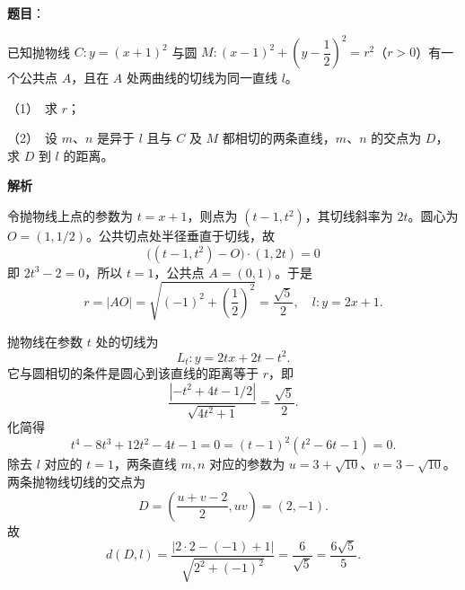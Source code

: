 \begin{answer}

\textbf{题目}：

已知抛物线 $C:y=(x+1)^2$ 与圆 $M:(x-1)^2+\left(y-\dfrac12\right)^2=r^2$（$r>0$）有一个公共点 $A$，且在 $A$ 处两曲线的切线为同一直线 $l$。

（1）　求 $r$；

（2）　设 $m\text{、}n$ 是异于 $l$ 且与 $C$ 及 $M$ 都相切的两条直线，$m\text{、}n$ 的交点为 $D$，求 $D$ 到 $l$ 的距离。

\textbf{解析}


令抛物线上点的参数为 $t=x+1$，则点为 $(t-1,t^2)$，其切线斜率为 $2t$。圆心为 $O=(1,1/2)$。公共切点处半径垂直于切线，故
\nopagebreak[4]
\[
\bigl((t-1,t^2)-O\bigr)\cdot(1,2t)=0
\]
即 $2t^3-2=0$，所以 $t=1$，公共点 $A=(0,1)$。于是
\nopagebreak[4]
\[
r=|AO|=\sqrt{(-1)^2+\left(\frac12\right)^2}=\frac{\sqrt5}{2},
\quad l:y=2x+1.
\]


抛物线在参数 $t$ 处的切线为
\nopagebreak[4]
\[
L_t:y=2tx+2t-t^2.
\]
它与圆相切的条件是圆心到该直线的距离等于 $r$，即
\nopagebreak[4]
\[
\frac{|{-t^2+4t-1/2}|}{\sqrt{4t^2+1}}=\frac{\sqrt5}{2}.
\]
化简得
\nopagebreak[4]
\[
t^4-8t^3+12t^2-4t-1=0
=(t-1)^2(t^2-6t-1)=0.
\]
除去 $l$ 对应的 $t=1$，两条直线 $m,n$ 对应的参数为 $u=3+\sqrt{10}$、$v=3-\sqrt{10}$。两条抛物线切线的交点为
\nopagebreak[4]
\[
D=\left(\frac{u+v-2}{2},uv\right)=(2,-1).
\]
故
\nopagebreak[4]
\[
d(D,l)=\frac{|2\cdot2-(-1)+1|}{\sqrt{2^2+(-1)^2}}=\frac6{\sqrt5}=\frac{6\sqrt5}{5}.
\]



\end{answer}
